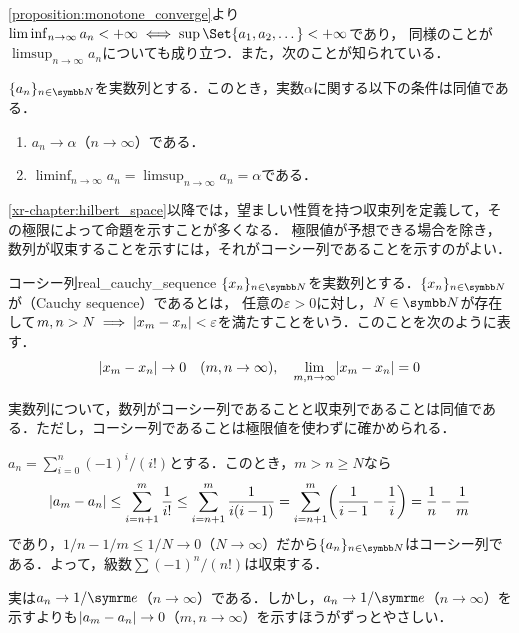 \documentclass[../../main]{subfiles}
\begin{document}
\cref{proposition:monotone_converge}より\(\liminf_{n\to\infty}a_n<+\infty\iff\sup\Set{a_1,a_2,\dotsc}<+\infty\)であり，
同様のことが\(\limsup_{n\to\infty}a_n\)についても成り立つ．また，次のことが知られている．

\begin{proposition}{}{}
  \(\seq{a_n}_{n\in\numset{N}}\)を実数列とする．このとき，実数\(\alpha\)に関する以下の条件は同値である．
  \begin{enumerate}
    \item \(a_n\to\alpha\)（\(n\to\infty\)）である．
    \item \(\liminf_{n\to\infty}a_n=\limsup_{n\to\infty}a_n=\alpha\)である．
  \end{enumerate}
\end{proposition}

\cref{xr-chapter:hilbert_space}以降では，望ましい性質を持つ収束列を定義して，その極限によって命題を示すことが多くなる．
極限値が予想できる場合を除き，数列が収束することを示すには，それがコーシー列であることを示すのがよい．

\begin{definition}{コーシー列}{real_cauchy_sequence}
  \(\seq{x_n}_{n\in\numset{N}}\)を実数列とする．\(\seq{x_n}_{n\in\numset{N}}\)が（Cauchy sequence）であるとは，
  任意の\(\varepsilon>0\)に対し，\(N\in\numset{N}\)が存在して\(m,n>N\implies\lvert x_m-x_n\rvert<\varepsilon\)を満たすことをいう．このことを次のように表す．
  \[
    \lvert x_m-x_n\rvert \to 0\quad(m,n\to\infty),
    \quad\lim_{m,n\to\infty}\lvert x_m-x_n\rvert = 0
  \]
\end{definition}

実数列について，数列がコーシー列であることと収束列であることは同値である．ただし，コーシー列であることは極限値を使わずに確かめられる．

\begin{example}
  \(a_n=\sum_{i=0}^n(-1)^i/(i!)\)とする．このとき，\(m>n\geq N\)なら
  \[
    \abs{a_m-a_n} \leq \sum_{i=n+1}^m\frac{1}{i!}
    \leq \sum_{i=n+1}^m\frac{1}{i(i-1)}
    = \sum_{i=n+1}^m\pqty*{\frac{1}{i-1}-\frac{1}{i}}
    = \frac{1}{n}-\frac{1}{m}
  \]
  であり，\(1/n-1/m\leq 1/N\to 0\)（\(N\to\infty\)）だから\(\seq{a_n}_{n\in\numset{N}}\)はコーシー列である．よって，級数\(\sum(-1)^n/(n!)\)は収束する．
\end{example}

\begin{note}
  実は\(a_n\to 1/\napr\)（\(n\to\infty\)）である．しかし，\(a_n\to 1/\napr\)（\(n\to\infty\)）を示すよりも\(\lvert a_m-a_n\rvert\to 0\)（\(m,n\to\infty\)）を示すほうがずっとやさしい．
\end{note}
\end{document}
